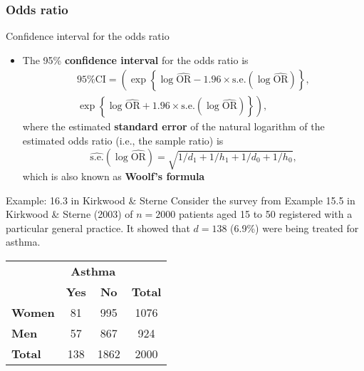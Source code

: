 \documentclass[compress, notes=hide]{beamer}
\newcommand{\hl}[1]{\textbf{#1}}
\begin{document}
\begin{frame}
					  \frametitle{Odds ratio} 
\begin{block}{Confidence interval for the odds ratio}
\begin{itemize}
\item The 95\% \hl{confidence interval} for the odds ratio is
\begin{multline}
\text{95\% CI} = \left( \exp \left\{ \log \widehat{\mathrm{OR}} - 1.96 \times \mathrm{s.e.} \left( \log \widehat{\mathrm{OR}} \right) \right\}, \right. \\ \left. \exp \left\{ \log \widehat{\mathrm{OR}} + 1.96 \times \mathrm{s.e.} \left( \log \widehat{\mathrm{OR}} \right) \right\} \right),\nonumber
\end{multline}
where the estimated \hl{standard error} of the natural logarithm of the estimated odds ratio (i.e., the sample ratio) is
\begin{equation}
\widehat{\mathrm{s.e.}}(\log \widehat{\mathrm{OR}}) = \sqrt{1/d_1 + 1/h_1 + 1/d_0 + 1/h_0},\nonumber
\end{equation}
which is also known as \hl{Woolf's formula}
\end{itemize}
\end{block}
\end{frame}




\begin{frame}
\begin{block}{Example: 16.3 in Kirkwood \& Sterne}
  Consider the survey from Example 15.5 in Kirkwood \& Sterne (2003)
  of $n=2000$ patients aged 15 to 50 registered with a particular
  general practice. It showed that $d=138$ (6.9\%) were being treated
  for asthma.
\begin{table}
\begin{normalsize}
\begin{tabular}{lccc}
\hline
& \multicolumn{2}{c}{\textbf{Asthma}} &
\\
\cline{2-3}
& \textbf{Yes} & \textbf{No} & \textbf{Total}
\\
\hline
\textbf{Women} & 81 & 995 & 1076
\\
\textbf{Men} & 57 & 867 & 924
\\
\hline
\textbf{Total} & 138 & 1862 & 2000
\\
\hline
\end{tabular}
\end{normalsize}
\end{table}
\end{block}
\end{frame}
\end{document}

